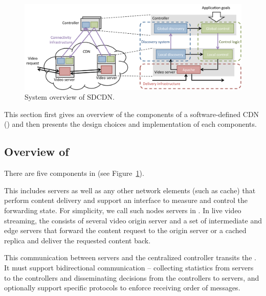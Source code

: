 \begin{figure}[t]
\centering
\includegraphics[width=2.0\columnwidth]{figures/system-overview-2.pdf}
\caption{System overview of SDCDN.}
\label{fig:system-overview}
\end{figure}

This section first gives an overview of the components of a software-defined CDN (\SDCDN) and then presents the design choices and implementation of each components. 

\subsection{Overview of \SDCDN}

There are five components in  (see Figure~\ref{fig:system-overview}). 

\myparatight{\Data} This includes servers as well as any other network elements (such as cache) that perform content delivery and support an interface to measure and control the forwarding state. For simplicity, we call such nodes servers in \data. In live video streaming, the \data consists of several video origin server and a set of intermediate and edge servers that forward the content request to the origin server or a cached replica and deliver the requested content back.

\myparatight{\Dissemination} This communication between servers and the centralized controller transits the \dissemination. It must support bidirectional communication -- collecting statistics from servers to the controllers and disseminating decisions from the controllers to servers, and optionally support specific protocols to enforce receiving order of messages.

